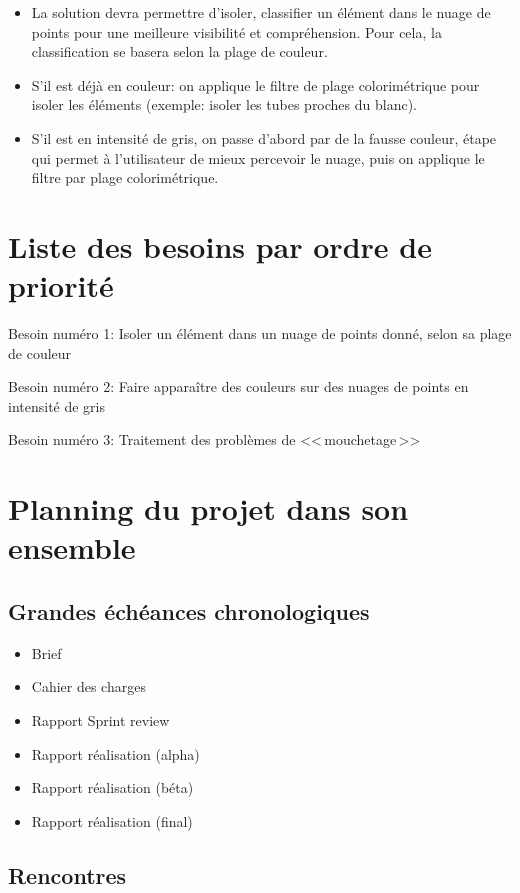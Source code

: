 \documentclass[12pt,titlepage,french]{article}
\begin{document}
\begin{itemize}
  \item La solution devra permettre d'isoler, classifier un élément dans le nuage de points pour une meilleure visibilité et compréhension. Pour cela, la classification se basera selon la plage de couleur.
  \item S'il est déjà en couleur: on applique le filtre de plage colorimétrique pour isoler les éléments (exemple: isoler les tubes proches du blanc).
  \item S'il est en intensité de gris, on passe d'abord par de la fausse couleur, étape qui permet à l'utilisateur de mieux percevoir le nuage, puis on applique le filtre par plage colorimétrique.
\end{itemize}

\section{Liste des besoins par ordre de priorité}

Besoin numéro 1: Isoler un élément dans un nuage de points donné, selon sa plage de couleur

Besoin numéro 2: Faire apparaître des couleurs sur des nuages de points en intensité de gris

Besoin numéro 3: Traitement des problèmes de <<\,mouchetage\,>>


\section{Planning du projet dans son ensemble}

\subsection*{Grandes échéances chronologiques}

\begin{itemize}
  \item Brief
  \item Cahier des charges
  \item Rapport Sprint review
  \item Rapport réalisation (alpha)
  \item Rapport réalisation (béta)
  \item Rapport réalisation (final)
\end{itemize}

\subsection*{Rencontres}
\end{document}
